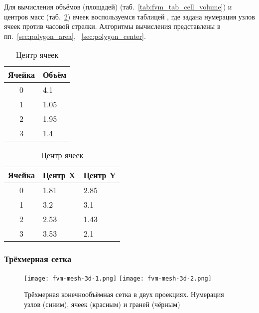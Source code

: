 Для вычисления объёмов (площадей) (таб.~\ref{tab:fvm_tab_cell_volume}) и центров масс (таб.~\ref{tab:fvm_tab_cell_center}) ячеек воспользуемся таблицей ,
где задана нумерация узлов ячеек против часовой стрелки.
Алгоритмы вычисления представлены в пп.~\ref{sec:polygon_area}, ~\ref{sec:polygon_center}.
\begin{table}[H]
\centering
    \begin{minipage}[t]{.4\linewidth}
      \centering
      \begin{tabular}[t]{c|l}
      Ячейка & Объём\\
      \hline
      0 &  4.1    \\
      1 &  1.05   \\
      2 &  1.95   \\
      3 &  1.4    \\
      \end{tabular}
      \caption{\label{tab:fvm_tab_cell_volume} Объём ячеек}
    \end{minipage}
    \qquad
    \begin{minipage}[t]{.4\linewidth}
        \centering
        \begin{tabular}[t]{c|l|l}
        Ячейка & Центр X & Центр Y \\
        \hline
        0 &  1.81   &  2.85 \\
        1 &  3.2    &  3.1  \\
        2 &  2.53   &  1.43 \\
        3 &  3.53   &  2.1  \\
        \end{tabular}
        \caption{\label{tab:fvm_tab_cell_center} Центр ячеек}
    \end{minipage}
\end{table}

\subsubsection{Трёхмерная сетка}
\begin{figure}[h!]
\centering
\texttt{[image: fvm-mesh-3d-1.png]}
\texttt{[image: fvm-mesh-3d-2.png]}
\caption{Трёхмерная конечнообъёмная сетка в двух проекциях. Нумерация узлов (синим), ячеек (красным) и граней (чёрным)}
\label{fig:fvm-mesh-2d}
\end{figure}

